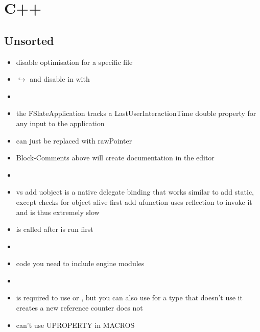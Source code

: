 \chapter{C++}

    \section{Unsorted}


    \begin{itemize}
        \item disable optimisation for a specific file \\ 
        \item $\hookrightarrow$ and disable  in  with 
        \item 
        \item the FSlateApplication tracks a LastUserInteractionTime double property for any input to the application
        \item {} can just be replaced with rawPointer
        \item Block-Comments above  will create documentation in the editor
        \item 
        \item {} vs  add uobject is a native delegate binding that works similar to add static, except checks for object alive first
        add ufunction uses reflection to invoke it and is thus extremely slow
        \item {} is called after  is run first
        \item 
        \item code you need to include engine modules 
        \item 
        \item {} is required to use  or , but you can also use  for a type that doesn't use it 
                 creates a new reference counter
                 does not
        \item can't use UPROPERTY in MACROS
    \end{itemize}

